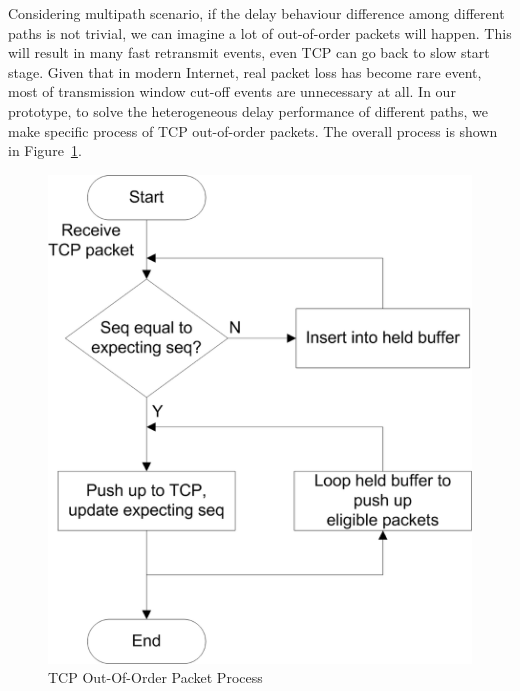 
Considering multipath scenario, if the delay behaviour difference among different paths is not trivial, we can imagine a lot of out-of-order packets will happen. This will result in many fast retransmit events, even TCP can go back to slow start stage. Given that in modern Internet, real packet loss has become rare event, most of transmission window cut-off events are unnecessary at all. In our prototype, to solve the heterogeneous delay performance of different paths, we make specific process of TCP out-of-order packets. The overall process is shown in Figure~\ref{fig.outoforder}.

\begin{figure}
\centering
\includegraphics[width=0.8\linewidth]{fig/outoforder.eps}
\caption{TCP Out-Of-Order Packet Process}
\label{fig.outoforder}
\end{figure}


